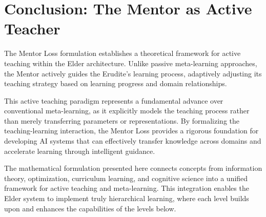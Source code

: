 \section{Conclusion: The Mentor as Active Teacher}

The Mentor Loss formulation establishes a theoretical framework for active teaching within the Elder architecture. Unlike passive meta-learning approaches, the Mentor actively guides the Erudite's learning process, adaptively adjusting its teaching strategy based on learning progress and domain relationships.

This active teaching paradigm represents a fundamental advance over conventional meta-learning, as it explicitly models the teaching process rather than merely transferring parameters or representations. By formalizing the teaching-learning interaction, the Mentor Loss provides a rigorous foundation for developing AI systems that can effectively transfer knowledge across domains and accelerate learning through intelligent guidance.

The mathematical formulation presented here connects concepts from information theory, optimization, curriculum learning, and cognitive science into a unified framework for active teaching and meta-learning. This integration enables the Elder system to implement truly hierarchical learning, where each level builds upon and enhances the capabilities of the levels below.